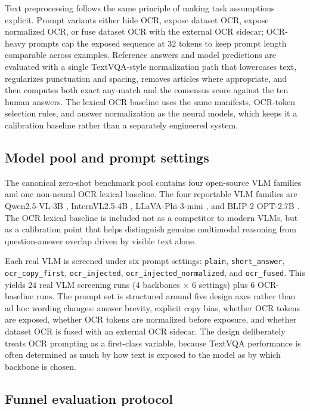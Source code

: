 Text preprocessing follows the same principle of making task assumptions explicit. Prompt variants either hide OCR, expose dataset OCR, expose normalized OCR, or fuse dataset OCR with the external OCR sidecar; OCR-heavy prompts cap the exposed sequence at $32$ tokens to keep prompt length comparable across examples. Reference answers and model predictions are evaluated with a single TextVQA-style normalization path that lowercases text, regularizes punctuation and spacing, removes articles where appropriate, and then computes both exact any-match and the consensus score against the ten human answers. The lexical OCR baseline uses the same manifests, OCR-token selection rules, and answer normalization as the neural models, which keeps it a calibration baseline rather than a separately engineered system.

\subsection{Model pool and prompt settings}

The canonical zero-shot benchmark pool contains four open-source VLM families and one non-neural OCR lexical baseline. The four reportable VLM families are Qwen2.5-VL-3B \citep{qwen2025qwen25vl}, InternVL2.5-4B \citep{chen2024internvl25}, LLaVA-Phi-3-mini \citep{liu2023visual,abdin2024phi3}, and BLIP-2 OPT-2.7B \citep{li2023blip2}. The OCR lexical baseline is included not as a competitor to modern VLMs, but as a calibration point that helps distinguish genuine multimodal reasoning from question-answer overlap driven by visible text alone.

Each real VLM is screened under six prompt settings: \texttt{plain}, \texttt{short\_answer}, \texttt{ocr\_copy\_first}, \texttt{ocr\_injected}, \texttt{ocr\_injected\_normalized}, and \texttt{ocr\_fused}. This yields $24$ real VLM screening runs ($4$ backbones $\times$ $6$ settings) plus $6$ OCR-baseline runs. The prompt set is structured around five design axes rather than ad hoc wording changes: answer brevity, explicit copy bias, whether OCR tokens are exposed, whether OCR tokens are normalized before exposure, and whether dataset OCR is fused with an external OCR sidecar. The design deliberately treats OCR prompting as a first-class variable, because TextVQA performance is often determined as much by how text is exposed to the model as by which backbone is chosen.

\subsection{Funnel evaluation protocol}

